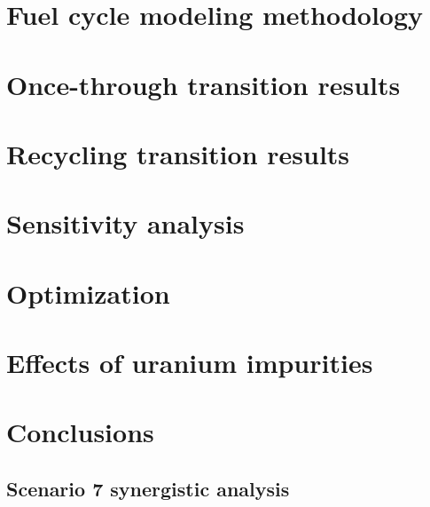 \documentclass[edeposit,fullpage]{uiucthesis2018}
\begin{document}
\chapter{Fuel cycle modeling methodology} \label{ch:fc_methods}


\chapter{Once-through transition results} \label{ch:once_through_results}


\chapter{Recycling transition results} \label{ch:recycle_results}


\chapter{Sensitivity analysis} \label{ch:sa}

\chapter{Optimization}\label{ch:optimization}


\chapter{Effects of uranium impurities} \label{ch:neutronics}


\chapter{Conclusions} \label{ch:conclusions}


\begin{appendices}
\chapter{Scenario 7 synergistic analysis}\label{app:s7_synergistic}


\end{appendices}

\backmatter



\end{document}
